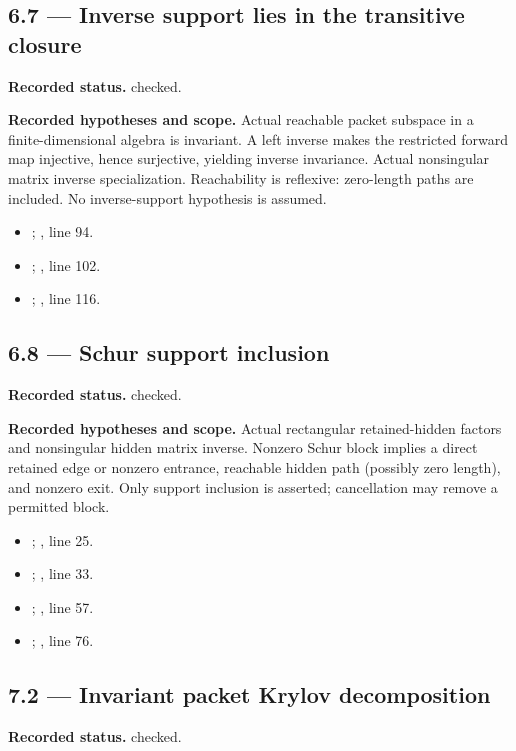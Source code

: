 \subsection{6.7 — Inverse support lies in the transitive closure}
\label{result:6.7}
\textbf{Recorded status.} checked.

\textbf{Recorded hypotheses and scope.} Actual reachable packet subspace in a finite-dimensional algebra is invariant. A left inverse makes the restricted forward map injective, hence surjective, yielding inverse invariance. Actual nonsingular matrix inverse specialization. Reachability is reflexive: zero-length paths are included. No inverse-support hypothesis is assumed.

\begin{itemize}
\item {}; , line 94.
\item {}; , line 102.
\item {}; , line 116.
\end{itemize}
\subsection{6.8 — Schur support inclusion}
\label{result:6.8}
\textbf{Recorded status.} checked.

\textbf{Recorded hypotheses and scope.} Actual rectangular retained-hidden factors and nonsingular hidden matrix inverse. Nonzero Schur block implies a direct retained edge or nonzero entrance, reachable hidden path (possibly zero length), and nonzero exit. Only support inclusion is asserted; cancellation may remove a permitted block.

\begin{itemize}
\item {}; , line 25.
\item {}; , line 33.
\item {}; , line 57.
\item {}; , line 76.
\end{itemize}
\subsection{7.2 — Invariant packet Krylov decomposition}
\label{result:7.2}
\textbf{Recorded status.} checked.

